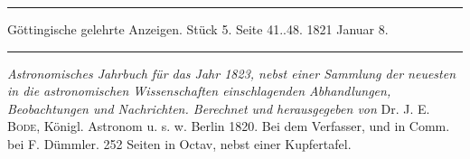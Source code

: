 \par\bigskip
\hypertarget{native-630-lower}{}
\begin{center}
\parbox{.92\linewidth}{\centering\small
\rule{\linewidth}{.3pt}\par\smallskip
Göttingische gelehrte Anzeigen. Stück 5. Seite 41..48. 1821 Januar 8.\par\smallskip
\rule{\linewidth}{.3pt}}
\end{center}
\par\medskip

\emph{Astronomisches Jahrbuch für das Jahr \textup{1823}, nebst einer Sammlung der neuesten in die astronomischen Wissenschaften einschlagenden Abhandlungen, Beobachtungen und Nachrichten. Berechnet und herausgegeben von} Dr. J. E. \textsc{Bode}, Königl. Astronom u. s. w. Berlin 1820. Bei dem Verfasser, und in Comm. bei F. Dümmler. 252 Seiten in Octav, nebst einer Kupfertafel.

